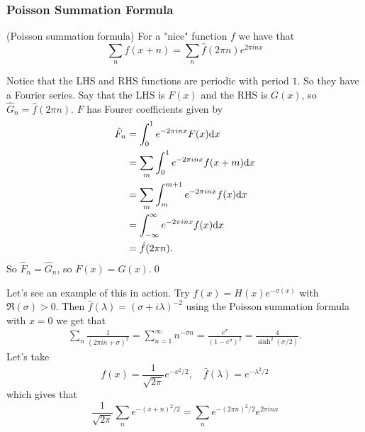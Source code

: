 \documentclass{article}
\begin{document}
\subsubsection{Poisson Summation Formula}
\begin{proposition}
	(Poisson summation formula) For a "nice" function $ f $ we have that
  \[
	  \sum_nf(x+n)=\sum_n\hat f(2\pi n)e^{2\pi in x}
  \]
\end{proposition}
\pf Notice that the LHS and RHS functions are periodic with period $ 1 $. So they have a Fourier series. Say that the LHS is $ F(x) $ and the RHS is $ G(x) $, so $ \hat G_n=\hat f(2\pi n) $. $ F $ has Fourer coefficients given by
\begin{align*}
	\hat F_n&=\int_0^1e^{-2\pi in x}F(x)\mathrm dx \\
		&=\sum_m\int_0^1 e^{-2\pi inx}f(x+m)\mathrm dx\\
		&= \sum_m\int_m^{m+1}e^{-2\pi i nx}f(x)\mathrm dx\\
		&=\int_{-\infty}^\infty e^{-2\pi inx}f(x)\mathrm dx\\
		&= \hat f(2\pi n).
\end{align*}
So $ \hat F_n=\hat G_n $, so $ F(x)=G(x) $.\qed
\par
Let's see an example of this in action. Try $ f(x)=H(x)e^{-\sigma(x)} $ with $ \Re(\sigma)>0 $. Then $ \hat f(\lambda)=(\sigma+i\lambda)^{-2} $ using the Poisson summation formula with $ x=0 $ we get that
\begin{align*}
	\sum_n\frac1{(2\pi in +\sigma)^2}=\sum_{n=1}^\infty n^{-\sigma n}=\frac{e^\sigma}{(1-e^{\sigma})^2}=\frac 4{\sinh^2(\sigma/2)}.
\end{align*}
Let's take
\[
	f(x)=\frac1{\sqrt{2\pi}}e^{-x^2/2},\quad \hat f(\lambda)=e^{-\lambda^2/2}
\]
which gives that
\[
	\frac 1{\sqrt{2\pi}}\sum_ne^{-(x+n)^2/2}=\sum_ne^{-(2\pi n)^2/2}e^{2\pi inx}
\]
\end{document}
